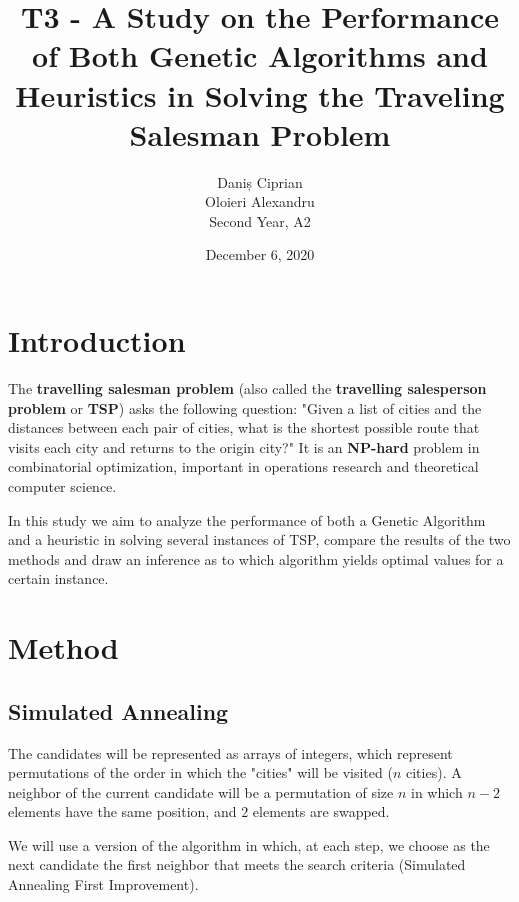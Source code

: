 \documentclass[a4paper]{article}
\title{T3 - A Study on the Performance of Both Genetic Algorithms and Heuristics in Solving the Traveling Salesman Problem}
\author{Daniș Ciprian\\
	Oloieri Alexandru \\
	Second Year, A2}
\date{December 6, 2020}
\begin{document}
\maketitle
\justify
\section{Introduction}

The \textbf{travelling salesman problem} (also called the \textbf{travelling salesperson problem} or \textbf{TSP}) asks the following question: "Given a list of cities and the distances between each pair of cities, what is the shortest possible route that visits each city and returns to the origin city?" It is an \textbf{NP-hard} problem in combinatorial optimization, important in operations research and theoretical computer science.

In this study we aim to analyze the performance of both a Genetic Algorithm and a heuristic in solving several instances of TSP, compare the results of the two methods and draw an inference as to which algorithm yields optimal values for a certain instance.

\section{Method}

\subsection{Simulated Annealing}

The candidates will be represented as arrays of integers, which represent permutations of the order in which the "cities" will be visited ($n$ cities). A neighbor of the current candidate will be a permutation of size $n$ in which $n-2$ elements have the same position, and $2$ elements are swapped.

We will use a version of the algorithm in which, at each step, we choose as the next candidate the first neighbor that meets the search criteria (Simulated Annealing First Improvement).
\end{document}

